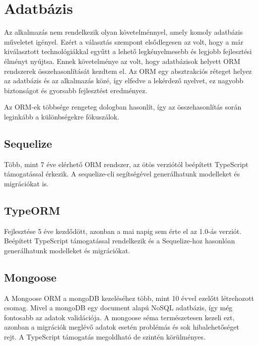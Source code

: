\section{Adatbázis}
Az alkalmazás nem rendelkezik olyan követelménnyel, amely komoly adatbázis műveletet igényel.
Ezért a választás szempont elsődlegesen az volt, hogy a már kiválasztott technológiákkal egyűtt a lehető legkényelmesebb és legjobb fejlesztési élményt nyújtsa. Ennek követelménye az volt, hogy adatbázisok helyett ORM rendszerek összehasonlítását kezdtem el.
Az ORM egy absztrakciós réteget helyez az adatbázis és az alkalmazás közé, így elfedve a lekérdező nyelvet, ez nagyobb biztonságot és gyorsabb fejlesztést eredményez.

Az ORM-ek többsége rengeteg dologban hasonlít, így az összehasonlítás során leginkább a különbségekre fókuszálok.

\subsection{Sequelize}
Több, mint 7 éve elérhető ORM rendszer, az ötös verziótól beépített TypeScript támogatással érkezik.
A sequelize-cli segítségével generálhatunk modelleket és migrációkat is.

\subsection{TypeORM}
Fejlesztése 5 éve kezdődött, azonban a mai napig sem érte el az 1.0-ás verziót.
Beépített TypeScript támogatással rendelkezik és a Sequelize-hoz hasonlóan generálhatunk modelleket és migrációkat.


\subsection{Mongoose}
A Mongoose ORM a mongoDB kezeléséhez több, mint 10 évvel ezelőtt létrehozott csomag. 
Mivel a mongoDB egy document alapú NoSQL adatbázis, így még fontosabb az adatok validációja.
A mongoose séma természetesen kezeli ezt, azonban a migrációk meglévő adatok esetén problémás és sok hibalehetőséget rejt.
A TypeScript támogatás megoldható de szintén körülményes.

